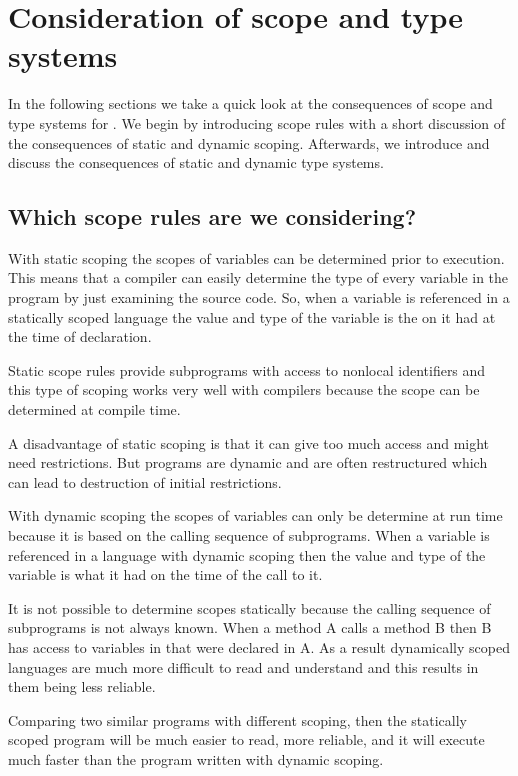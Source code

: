 \section{Consideration of scope and type systems}
\label{sec:anal-scoperules}
In the following sections we take a quick look at the consequences of scope and
type systems for \productname{}. We begin by introducing scope rules with a
short discussion of the consequences of static and dynamic scoping. Afterwards,
we introduce and discuss the consequences of static and dynamic type systems.

\subsection{Which scope rules are we considering?}

With static scoping the scopes of variables can be determined prior to
execution. This means that a compiler can easily determine the type of every
variable in the program by just examining the source code. So, when a variable
is referenced in a statically scoped language the value and type of the variable 
is the on it had at the time of declaration.


Static scope rules provide subprograms with access to nonlocal identifiers and
this type of scoping works very well with compilers because the scope can be
determined at compile time.

A disadvantage of static scoping is that it can give too much access and might
need restrictions. But programs are dynamic and are often restructured which
can lead to destruction of initial restrictions.

With dynamic scoping the scopes of variables can only be determine at run time
because it is based on the calling sequence of subprograms. When a variable is
referenced in a language with dynamic scoping then the value and type of the 
variable is what it had on the time of the call to it.
\cite[p. 227]{sebesta2013}

It is not possible to determine scopes statically because the calling sequence
of subprograms is not always known. When a method A calls a method B then B has 
access to variables in that were declared in A. As a result dynamically scoped
languages are much more difficult to read and understand and this results in
them being less reliable.


Comparing two similar programs with different scoping, then the statically
scoped program will be much easier to read, more reliable, and it will execute
much faster than the program written with dynamic scoping.
\cite[p. 229]{sebesta2013}


